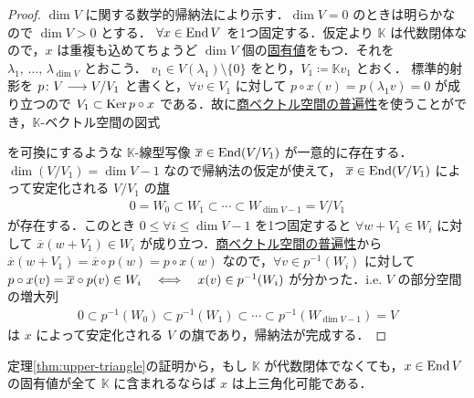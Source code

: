\documentclass[rep_main]{subfiles}
\begin{document}
\begin{proof}
    $\dim V$ に関する数学的帰納法により示す．$\dim V = 0$ のときは明らかなので
    $\dim V > 0$ とする．
    $\forall x \in \operatorname{End} V$ を1つ固定する．仮定より $\mathbb{K}$ は代数閉体なので，$x$ は重複も込めてちょうど $\dim V$ 個の\hyperref[def:eigen]{固有値}をもつ．それを $\lambda_1,\, \dots,\, \lambda_{\dim V}$ とおこう．
    $v_1 \in V(\lambda_1) \setminus \{0\}$ をとり，$V_1 \coloneqq \mathbb{K}v_1$ とおく．
    標準的射影を $p \colon V \longrightarrow V/V_1$ と書くと，$\forall v \in V_1$ に対して $p \circ x(v) = p(\lambda_1 v) = 0$ が成り立つので $V_1 \subset \operatorname{Ker} p \circ x$ である．故に\hyperref[prop:homo]{商ベクトル空間の普遍性}を使うことができ，$\mathbb{K}$-ベクトル空間の図式
    \begin{center}
    \end{center}
    を可換にするような $\mathbb{K}$-線型写像 $\overline{x} \in \operatorname{End} (V/V_1)$ が一意的に存在する．$\dim (V/V_1) = \dim V - 1$ なので帰納法の仮定が使えて，
    $\overline{x} \in \operatorname{End} (V/V_1)$ によって安定化される $V/V_1$ の\hyperref[def:flag]{旗}
    \begin{align}
        0 = W_0 \subset W_1 \subset \cdots \subset W_{\dim V - 1} = V/V_1
    \end{align}
    が存在する．このとき $0 \le \forall i \le \dim V - 1$ を1つ固定すると
    $\forall w + V_1 \in W_i$ に対して $\overline{x} (w+V_1) \in W_i$ が成り立つ．\hyperref[prop:homo]{商ベクトル空間の普遍性}から $\overline{x} (w + V_1) = \overline{x} \circ p(w) = p \circ x(w)$ なので，$\forall v \in p^{-1}(W_i)$ に対して $p \circ x(v) = \overline{x} \circ p(v) \in W_i \quad \Longleftrightarrow \quad x(v) \in p^{-1}(W_i)$ が分かった．i.e. $V$ の部分空間の増大列
    \begin{align}
        0 \subset p^{-1}(W_0) \subset p^{-1}(W_1) \subset \cdots \subset p^{-1}(W_{\dim V - 1}) = V
    \end{align}
    は $x$ によって安定化される $V$ の旗であり，帰納法が完成する．
\end{proof}

\begin{marker}
    定理\ref{thm:upper-triangle}の証明から，もし $\mathbb{K}$ が代数閉体でなくても，$x \in \operatorname{End} V$ の固有値が全て $\mathbb{K}$ に含まれるならば $x$ は上三角化可能である．
\end{marker}
\end{document}
